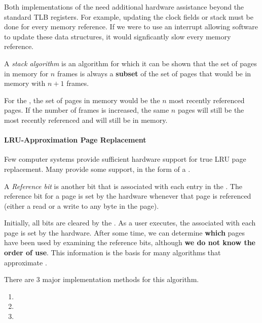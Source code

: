 Both implementations of the  need additional hardware assistance beyond the standard TLB registers.
For example, updating the clock fields or stack must be done for every memory reference.
If we were to use an interrupt allowing software to update these data structures, it would signficantly slow every memory reference.

\begin{definition}\label{def:Stack_Algorithm}
  A \emph{stack algorithm} is an algorithm for which it can be shown that the set of pages in memory for $n$ frames is always a \textbf{subset} of the set of pages that would be in memory with $n+1$ frames.

  For the , the set of pages in memory would be the $n$ most recently referenced pages.
  If the number of frames is increased, the same $n$ pages will still be the most recently referenced and will still be in memory.
\end{definition}

\paragraph{LRU-Approximation Page Replacement}\label{par:LRU_Approximation_Page_Replacement}
Few computer systems provide sufficient hardware support for true LRU page replacement.
Many provide some support, in the form of a .

\begin{definition}\label{def:Reference_Bit}
  A \emph{Reference bit} is another bit that is associated with each entry in the .
  The reference bit for a page is set by the hardware whenever that page is referenced (either a read or a write to any byte in the page).
\end{definition}

Initially, all bits are cleared by the .
As a user  executes, the  associated with each page is set by the hardware.
After some time, we can determine \textbf{which} pages have been used by examining the reference bits, although \textbf{we do not know the order of use}.
This information is the basis for many  algorithms that approximate .

There are 3 major implementation methods for this algorithm.
\begin{enumerate}[noitemsep]
\item {}
\item {}
\item {}
\end{enumerate}

